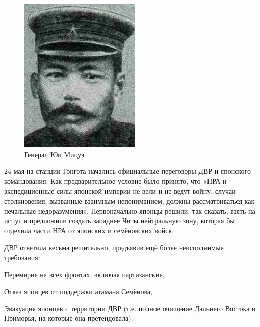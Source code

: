 \begin{figure}[h!tb] 
	\centering\includegraphics[scale=0.6]{Glava6/ewTaUGtiF2w.jpg}
	\caption{Генерал Юи Мицуэ}%
\end{figure}

24 мая на станции Гонгота начались официальные переговоры ДВР и японского командования. Как предварительное условие было принято, что «НРА и экспедиционные силы японской империи не вели и не ведут войну, случаи столкновения, вызванные взаимным непониманием, должны рассматриваться как печальные недоразумения». Первоначально японцы решили, так сказать, взять на испуг и предложили создать западнее Читы нейтральную зону, которая бы отделила части НРА от японских и семёновских войск.

ДВР ответила весьма решительно, предъявив ещё более неисполнимые требования:

Перемирие на всех фронтах, включая партизанские,

Отказ японцев от поддержки атамана Семёнова,

Эвакуация японцев с территории ДВР (т.е. полное очищение Дальнего Востока и Приморья, на которые она претендовала).

